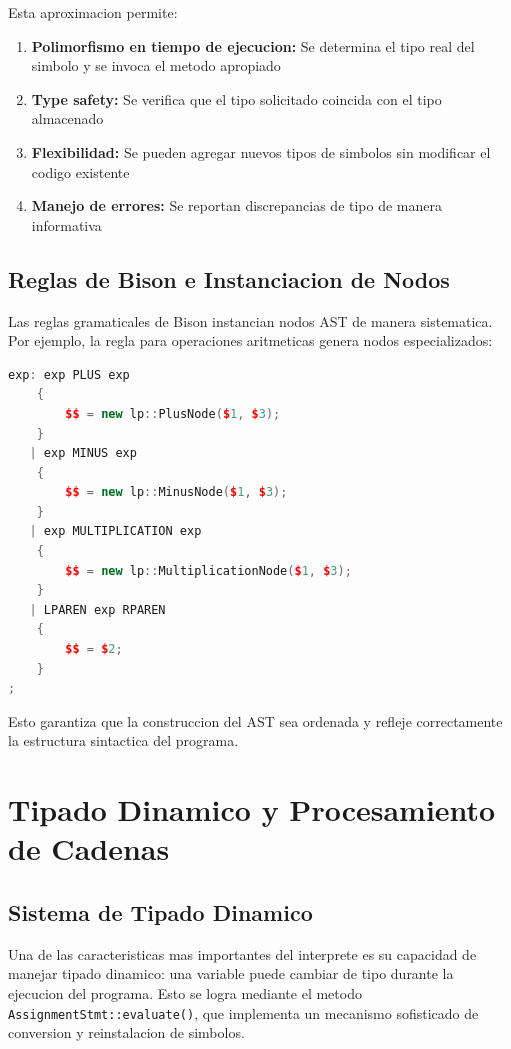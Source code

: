 \documentclass[11pt,a4paper]{article}
\begin{document}
Esta aproximacion permite:

\begin{enumerate}
    \item \textbf{Polimorfismo en tiempo de ejecucion:} Se determina el tipo real del simbolo y se invoca el metodo apropiado
    \item \textbf{Type safety:} Se verifica que el tipo solicitado coincida con el tipo almacenado
    \item \textbf{Flexibilidad:} Se pueden agregar nuevos tipos de simbolos sin modificar el codigo existente
    \item \textbf{Manejo de errores:} Se reportan discrepancias de tipo de manera informativa
\end{enumerate}

\subsection{Reglas de Bison e Instanciacion de Nodos}

Las reglas gramaticales de Bison instancian nodos AST de manera sistematica. Por ejemplo, la regla para operaciones aritmeticas genera nodos especializados:

\begin{lstlisting}[language=C++, caption={Fragmento de gramatica Bison para operadores}]
exp: exp PLUS exp
    {
        $$ = new lp::PlusNode($1, $3);
    }
   | exp MINUS exp
    {
        $$ = new lp::MinusNode($1, $3);
    }
   | exp MULTIPLICATION exp
    {
        $$ = new lp::MultiplicationNode($1, $3);
    }
   | LPAREN exp RPAREN
    {
        $$ = $2;
    }
;
\end{lstlisting}

Esto garantiza que la construccion del AST sea ordenada y refleje correctamente la estructura sintactica del programa.

\newpage

\section{Tipado Dinamico y Procesamiento de Cadenas}

\subsection{Sistema de Tipado Dinamico}

Una de las caracteristicas mas importantes del interprete es su capacidad de manejar tipado dinamico: una variable puede cambiar de tipo durante la ejecucion del programa. Esto se logra mediante el metodo \texttt{AssignmentStmt::evaluate()}, que implementa un mecanismo sofisticado de conversion y reinstalacion de simbolos.
\end{document}
